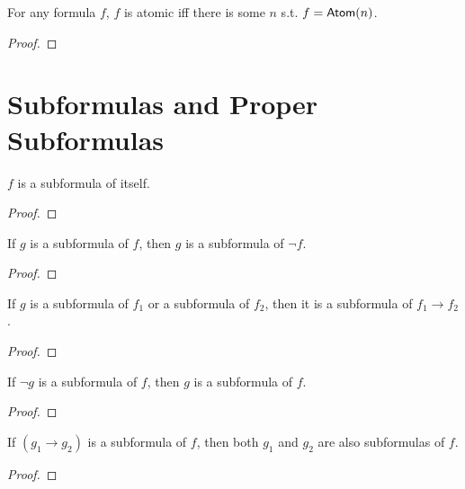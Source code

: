\begin{lemma}
    \label{not_nonAtomic}
    \leanok
    For any formula $f$, $f$ is atomic iff there is some $n$ s.t. $f = \mathsf{Atom}(n)$.
\end{lemma}
\begin{proof}
    \leanok
\end{proof}

\section{Subformulas and Proper Subformulas}

\begin{lemma}
    \label{sub_self}
    \leanok
    $f$ is a subformula of itself.
\end{lemma}
\begin{proof}
    \leanok
\end{proof}

\begin{lemma}
    \label{sub_neg}
    \leanok
    If $g$ is a subformula of $f$, then $g$ is a subformula of $\neg f$.
\end{lemma}
\begin{proof}
    \leanok
\end{proof}

\begin{lemma}
    \label{sub_imp}
    \leanok
    If $g$ is a subformula of $f_1$ or a subformula of $f_2$, then it is a subformula of $f_1 \to f_2$.
\end{lemma}
\begin{proof}
    \leanok
\end{proof}

\begin{lemma}
    \label{neg_sub}
    \leanok
    If $\neg g$ is a subformula of $f$, then $g$ is a subformula of $f$.
\end{lemma}
\begin{proof}
    \leanok
\end{proof}

\begin{lemma}
    \label{imp_sub}
    \leanok
    If $(g_1 \to g_2)$ is a subformula of $f$, then both $g_1$ and $g_2$ are also subformulas of $f$.
\end{lemma}
\begin{proof}
    \leanok
\end{proof}

